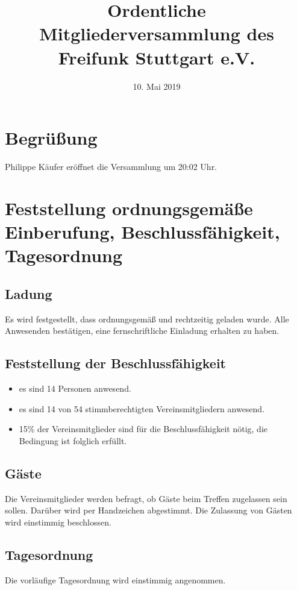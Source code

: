 \documentclass[a4paper]{scrartcl}
\date{10. Mai 2019}
\title{Ordentliche Mitgliederversammlung des Freifunk Stuttgart e.V.}
\begin{document}
\maketitle

\tableofcontents

\clearpage

\listoftables

\clearpage

\section{Begrüßung}
Philippe Käufer eröffnet die Versammlung um 20:02 Uhr.

\section{Feststellung ordnungsgemäße Einberufung, Beschlussfähigkeit, Tagesordnung}
\subsection{Ladung}
Es wird festgestellt, dass ordnungsgemäß und rechtzeitig geladen wurde. Alle Anwesenden bestätigen, eine fernschriftliche Einladung erhalten zu haben.

\subsection{Feststellung der Beschlussfähigkeit}
\begin{itemize}
\item es sind 14 Personen anwesend.
\item es sind 14 von 54 stimmberechtigten Vereinsmitgliedern anwesend.
\item 15\% der Vereinsmitglieder sind für die Beschlussfähigkeit nötig, die Bedingung ist folglich erfüllt.
\end{itemize}
\subsection{Gäste}
Die Vereinsmitglieder werden befragt, ob Gäste beim Treffen zugelassen sein sollen. Darüber wird per Handzeichen abgestimmt. Die Zulassung von Gästen wird einstimmig beschlossen.

\subsection{Tagesordnung}
Die vorläufige Tagesordnung wird einstimmig angenommen.
\end{document}
